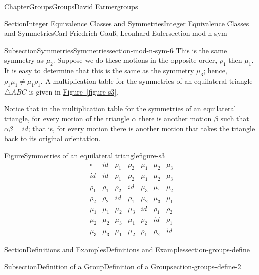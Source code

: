 \documentclass[oneside,10pt,]{book}
\newcommand{\xreffont}{\relax}
\numberwithin{equation}{section}
\begin{document}
\begin{chapterptx}{Chapter}{Groups}{}{Groups}{\hyperlink{dfarmer}{David Farmer}}{}{groups}
\begin{sectionptx}{Section}{Integer Equivalence Classes and Symmetries}{}{Integer Equivalence Classes and Symmetries}{Carl Friedrich Gauß, Leonhard Euler}{}{section-mod-n-sym}
\begin{subsectionptx}{Subsection}{Symmetries}{}{Symmetries}{}{}{section-mod-n-sym-6}
This is the same symmetry as \(\mu_2\). Suppose we do these motions in the opposite order, \(\rho_1\) then \(\mu_1\).  It is easy to determine that this is the same as the symmetry \(\mu_3\); hence, \(\rho_1 \mu_1 \neq \mu_1 \rho_1\).  A multiplication table for the symmetries of an equilateral triangle \(\bigtriangleup ABC\) is given in \hyperref[figure-s3]{Figure~{\xreffont\ref{figure-s3}}}.%
\par
Notice that in the multiplication table for the symmetries of an equilateral triangle, for every motion of the triangle \(\alpha\) there is another motion \(\beta\) such that \(\alpha \beta = id\); that is, for every motion there is another  motion that takes the triangle back to its original orientation.%
\begin{figureptx}{Figure}{Symmetries of an equilateral triangle}{figure-s3}{}%
\centering
%
\begin{equation*}
\begin{array}{c|cccccc}
\circ  & id     & \rho_1 & \rho_2 & \mu_1 & \mu_2 & \mu_3 \\
\hline
id     & id     & \rho_1 & \rho_2 & \mu_1 & \mu_2 & \mu_3 \\
\rho_1 & \rho_1 & \rho_2 & id     & \mu_3 & \mu_1 & \mu_2 \\
\rho_2 & \rho_2 & id     & \rho_1 & \mu_2 & \mu_3 & \mu_1 \\
\mu_1  & \mu_1  & \mu_2  & \mu_3  & id    & \rho_1& \rho_2\\
\mu_2  & \mu_2  & \mu_3  & \mu_1  & \rho_2 & id    & \rho_1\\
\mu_3  & \mu_3  & \mu_1  & \mu_2  & \rho_1 & \rho_2& id
\end{array}
\end{equation*}
%
\tcblower
\end{figureptx}%
\end{subsectionptx}
\end{sectionptx}
%
%
\typeout{************************************************}
\typeout{************************************************}
%
\begin{sectionptx}{Section}{Definitions and Examples}{}{Definitions and Examples}{}{}{section-groups-define}
%
%
\typeout{************************************************}
\typeout{************************************************}
%
\begin{subsectionptx}{Subsection}{Definition of a Group}{}{Definition of a Group}{}{}{section-groups-define-2}

\end{subsectionptx}
\end{sectionptx}
\end{chapterptx}
\end{document}
